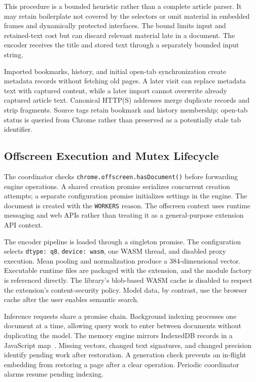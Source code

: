\documentclass[conference]{IEEEtran}
\newcommand{\mDimensions}{384}
\begin{document}
This procedure is a bounded heuristic rather than a complete article parser.
It may retain boilerplate not covered by the selectors or omit material in
embedded frames and dynamically protected interfaces. The bound limits input
and retained-text cost but can discard relevant material late in a document.
The encoder receives the title and stored text through a separately bounded
input string.

Imported bookmarks, history, and initial open-tab synchronization create
metadata records without fetching old pages. A later visit can replace
metadata text with captured content, while a later import cannot overwrite
already captured article text. Canonical HTTP(S) addresses merge duplicate
records and strip fragments. Source tags retain bookmark and history
membership; open-tab status is queried from Chrome rather than preserved as a
potentially stale tab identifier.

\subsection{Offscreen Execution and Mutex Lifecycle}
The coordinator checks \texttt{chrome.offscreen.hasDocument()} before forwarding
engine operations. A shared creation promise serializes concurrent creation
attempts; a separate configuration promise initializes settings in the engine.
The document is created with the \texttt{WORKERS} reason. The offscreen context
uses runtime messaging and web APIs rather than treating it as a
general-purpose extension API context.

The encoder pipeline is loaded through a singleton promise. The configuration
selects \texttt{dtype: q8}, \texttt{device: wasm}, one WASM thread, and disabled
proxy execution. Mean pooling and normalization produce a
\mDimensions{}-dimensional vector. Executable runtime files are packaged
with the extension, and the module factory is referenced directly. The
library's blob-based WASM cache is disabled to respect the extension's
content-security policy. Model data, by contrast, use the browser cache after
the user enables semantic search.

Inference requests share a promise chain. Background indexing processes one
document at a time, allowing query work to enter between documents without
duplicating the model. The memory engine mirrors IndexedDB records in a
JavaScript map~\cite{indexeddb}. Missing vectors, changed text signatures, and
changed precision identify pending work after restoration. A generation check
prevents an in-flight embedding from restoring a page after a clear operation.
Periodic coordinator alarms resume pending indexing.
\end{document}
